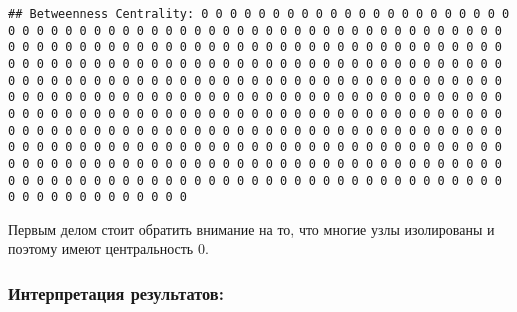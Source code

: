 \documentclass[
]{article}
\begin{document}
\begin{verbatim}
## Betweenness Centrality: 0 0 0 0 0 0 0 0 0 0 0 0 0 0 0 0 0 0 0 0 0 0 0 0 0 0 0 0 0 0 0 0 0 0 0 0 0 0 0 0 0 0 0 0 0 0 0 0 0 0 0 0 0 0 0 0 0 0 0 0 0 0 0 0 0 0 0 0 0 0 0 0 0 0 0 0 0 0 0 0 0 0 0 0 0 0 0 0 0 0 0 0 0 0 0 0 0 0 0 0 0 0 0 0 0 0 0 0 0 0 0 0 0 0 0 0 0 0 0 0 0 0 0 0 0 0 0 0 0 0 0 0 0 0 0 0 0 0 0 0 0 0 0 0 0 0 0 0 0 0 0 0 0 0 0 0 0 0 0 0 0 0 0 0 0 0 0 0 0 0 0 0 0 0 0 0 0 0 0 0 0 0 0 0 0 0 0 0 0 0 0 0 0 0 0 0 0 0 0 0 0 0 0 0 0 0 0 0 0 0 0 0 0 0 0 0 0 0 0 0 0 0 0 0 0 0 0 0 0 0 0 0 0 0 0 0 0 0 0 0 0 0 0 0 0 0 0 0 0 0 0 0 0 0 0 0 0 0 0 0 0 0 0 0 0 0 0 0 0 0 0 0 0 0 0 0 0 0 0 0 0 0 0 0 0 0 0 0 0 0 0 0 0 0 0 0 0 0 0 0 0 0 0 0 0 0 0 0 0 0 0 0 0 0 0 0 0 0 0 0 0 0 0 0 0 0 0 0 0 0 0 0 0 0 0 0 0 0 0 0 0 0 0 0 0 0 0 0 0 0 0 0 0 0 0 0 0 0 0 0 0 0 0 0 0 0 0 0 0 0 0 0 0 0 0 0 0 0 0 0 0 0 0 0 0
\end{verbatim}

Первым делом стоит обратить внимание на то, что многие узлы изолированы
и поэтому имеют центральность 0.

\hypertarget{ux438ux43dux442ux435ux440ux43fux440ux435ux442ux430ux446ux438ux44f-ux440ux435ux437ux443ux43bux44cux442ux430ux442ux43eux432-1}{%
\subsubsection{Интерпретация
результатов:}\label{ux438ux43dux442ux435ux440ux43fux440ux435ux442ux430ux446ux438ux44f-ux440ux435ux437ux443ux43bux44cux442ux430ux442ux43eux432-1}}
\end{document}
